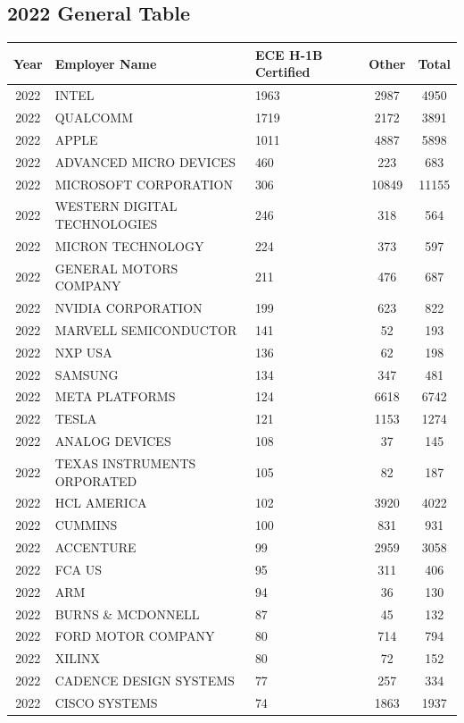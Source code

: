 \documentclass{article}%
\begin{document}
\subsection{2022 General Table}%
\label{subsec:2022GeneralTable}%
\begin{longtable}{c|p{20em}|p{5em}|c|c}%
\hline%
Year&Employer Name&ECE \newline%
 H{-}1B \newline%
 Certified&Other&Total\\%
\hline%
2022&INTEL&1963&2987&4950\\%
\hline%
2022&QUALCOMM&1719&2172&3891\\%
\hline%
2022&APPLE&1011&4887&5898\\%
\hline%
2022&ADVANCED MICRO DEVICES&460&223&683\\%
\hline%
2022&MICROSOFT CORPORATION&306&10849&11155\\%
\hline%
2022&WESTERN DIGITAL TECHNOLOGIES&246&318&564\\%
\hline%
2022&MICRON TECHNOLOGY&224&373&597\\%
\hline%
2022&GENERAL MOTORS COMPANY&211&476&687\\%
\hline%
2022&NVIDIA CORPORATION&199&623&822\\%
\hline%
2022&MARVELL SEMICONDUCTOR&141&52&193\\%
\hline%
2022&NXP USA&136&62&198\\%
\hline%
2022&SAMSUNG&134&347&481\\%
\hline%
2022&META PLATFORMS&124&6618&6742\\%
\hline%
2022&TESLA&121&1153&1274\\%
\hline%
2022&ANALOG DEVICES&108&37&145\\%
\hline%
2022&TEXAS INSTRUMENTS ORPORATED&105&82&187\\%
\hline%
2022&HCL AMERICA&102&3920&4022\\%
\hline%
2022&CUMMINS&100&831&931\\%
\hline%
2022&ACCENTURE&99&2959&3058\\%
\hline%
2022&FCA US&95&311&406\\%
\hline%
2022&ARM&94&36&130\\%
\hline%
2022&BURNS \& MCDONNELL&87&45&132\\%
\hline%
2022&FORD MOTOR COMPANY&80&714&794\\%
\hline%
2022&XILINX&80&72&152\\%
\hline%
2022&CADENCE DESIGN SYSTEMS&77&257&334\\%
\hline%
2022&CISCO SYSTEMS&74&1863&1937\\%

\end{longtable}
\end{document}
